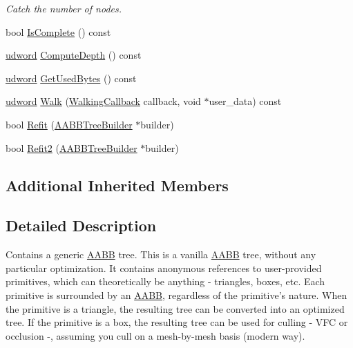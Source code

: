 \begin{DoxyCompactItemize}
\begin{DoxyCompactList}\small\item\em Catch the number of nodes. \end{DoxyCompactList}\item 
bool \hyperlink{class_a_a_b_b_tree_af03ae8eaa80a889ef6c715a0c9313c7a}{Is\+Complete} () const 
\item 
\hyperlink{_ice_types_8h_a44c6f1920ba5551225fb534f9d1a1733}{udword} \hyperlink{class_a_a_b_b_tree_a0f9b2f254109393c75dad19f1d63cc3c}{Compute\+Depth} () const 
\item 
\hyperlink{_ice_types_8h_a44c6f1920ba5551225fb534f9d1a1733}{udword} \hyperlink{class_a_a_b_b_tree_a2d646d050c93b9600c74a27259d39882}{Get\+Used\+Bytes} () const 
\item 
\hyperlink{_ice_types_8h_a44c6f1920ba5551225fb534f9d1a1733}{udword} \hyperlink{class_a_a_b_b_tree_a992607fb1f96ca3e378f0b465e49785b}{Walk} (\hyperlink{_o_p_c___a_a_b_b_tree_8h_ae6ec74ac6a40537f1fb0ddec8fd287cc}{Walking\+Callback} callback, void $\ast$user\+\_\+data) const 
\item 
bool \hyperlink{class_a_a_b_b_tree_a833fbf09b1989a73f852dfaf30e33546}{Refit} (\hyperlink{class_a_a_b_b_tree_builder}{A\+A\+B\+B\+Tree\+Builder} $\ast$builder)
\item 
bool \hyperlink{class_a_a_b_b_tree_a78b55dd9239d8ec9505f79b0601a8b1c}{Refit2} (\hyperlink{class_a_a_b_b_tree_builder}{A\+A\+B\+B\+Tree\+Builder} $\ast$builder)
\end{DoxyCompactItemize}
\subsection*{Additional Inherited Members}


\subsection{Detailed Description}
Contains a generic \hyperlink{class_a_a_b_b}{A\+A\+B\+B} tree. This is a vanilla \hyperlink{class_a_a_b_b}{A\+A\+B\+B} tree, without any particular optimization. It contains anonymous references to user-\/provided primitives, which can theoretically be anything -\/ triangles, boxes, etc. Each primitive is surrounded by an \hyperlink{class_a_a_b_b}{A\+A\+B\+B}, regardless of the primitive's nature. When the primitive is a triangle, the resulting tree can be converted into an optimized tree. If the primitive is a box, the resulting tree can be used for culling -\/ V\+F\+C or occlusion -\/, assuming you cull on a mesh-\/by-\/mesh basis (modern way).


